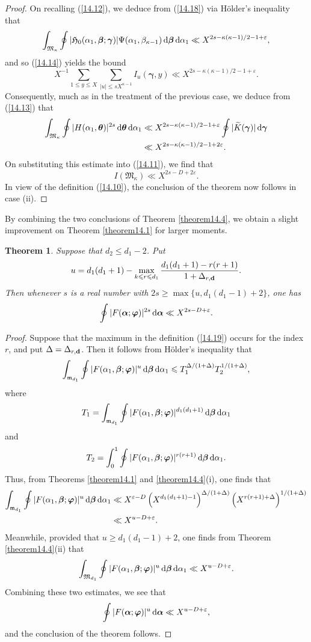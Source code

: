 \documentclass[12pt,reqno]{amsart}
\newtheorem{theorem}{Theorem}[section]
\theoremstyle{definition}
\theoremstyle{remark}
\numberwithin{equation}{section}
\def\bfd{{\mathbf d}} \def\bfe{{\mathbf e}} \def\bff{{\mathbf f}}
\def\grm{{\mathfrak m}}\def\grM{{\mathfrak M}}
\def\alp{{\alpha}} \def\bfalp{{\boldsymbol \alpha}}
\def\bet{{\beta}}  \def\bfbet{{\boldsymbol \beta}}
\def\gam{{\gamma}} \def\Gam{{\Gamma}}
\def\bfgam{{\boldsymbol \gam}}
\def\kap{{\kappa}}
\def\eps{\varepsilon}
\def\le{\leqslant} \def\ge{\geqslant} \def\pleq{\preccurlyeq} \def\ple{\prec}
\def\d{{\,{\rm d}}}
\begin{document}
\begin{proof}
On recalling (\ref{14.12}), we deduce from (\ref{14.18}) via H\"older's inequality that
$$\int_{\grM_\kap}\oint |\grH_0(\alp_1,\bfbet;\bfgam)|\Psi(\alp_1,\bet_{\kap-1})\d\bfbet 
\d\alp_1\ll X^{2s-\kap(\kap-1)/2-1+\eps},$$
and so (\ref{14.14}) yields the bound
$$X^{-1}\sum_{1\le y\le X}\sum_{|u|\le sX^{\kap-1}}I_u(\bfgam,y)\ll 
X^{2s-\kap(\kap-1)/2-1+\eps}.$$
Consequently, much as in the treatment of the previous case, we deduce from (\ref{14.13}) 
that
\begin{align*}
\int_{\grM_\kap}\oint |H(\alp_1,\bftet)|^{2s}\d\bftet \d\alp_1&\ll 
X^{2s-\kap(\kap-1)/2-1+\eps}\oint |\Ktil(\bfgam)|\d\bfgam \\
&\ll X^{2s-\kap(\kap-1)/2-1+2\eps}.
\end{align*}
On substituting this estimate into (\ref{14.11}), we find that
$$I(\grM_\kap)\ll X^{2s-D+2\eps}.$$
In view of the definition (\ref{14.10}), the conclusion of the theorem now follows in 
case (ii).
\end{proof}

By combining the two conclusions of Theorem \ref{theorem14.4}, we obtain a slight 
improvement on Theorem \ref{theorem14.1} for larger moments.

\begin{theorem}\label{theorem14.5} Suppose that $d_2\le d_1-2$. Put
\begin{equation}\label{14.19}
u=d_1(d_1+1)-\max_{k\le r\le d_1}\frac{d_1(d_1+1)-r(r+1)}{1+\Del_{r,\bfd}}.
\end{equation}
Then whenever $s$ is a real number with $2s\ge \max\{u,d_1(d_1-1)+2\}$, one has
$$\oint |F(\bfalp;\bfvarphi)|^{2s}\d\bfalp \ll X^{2s-D+\eps}.$$
\end{theorem}

\begin{proof} Suppose that the maximum in the definition (\ref{14.19}) occurs for the 
index $r$, and put $\Del=\Del_{r,\bfd}$. Then it follows from H\"older's inequality that
$$\int_{\grm_{d_1}}\oint |F(\alp_1,\bfbet;\bfvarphi)|^u\d\bfbet \d\alp_1 \le 
T_1^{\Del/(1+\Del)}T_2^{1/(1+\Del)},$$
where
$$T_1=\int_{\grm_{d_1}}\oint |F(\alp_1,\bfbet;\bfvarphi)|^{d_1(d_1+1)}\d\bfbet 
\d\alp_1$$
and
$$T_2=\int_0^1\oint |F(\alp_1,\bfbet;\bfvarphi)|^{r(r+1)}\d\bfbet \d\alp_1.$$
Thus, from Theorems \ref{theorem14.1} and \ref{theorem14.4}(i), one finds that
\begin{align*}
\int_{\grm_{d_1}}\oint |F(\alp_1,\bfbet;\bfvarphi)|^u\d\bfbet \d\alp_1&\ll X^{\eps-D}
\left( X^{d_1(d_1+1)-1} \right)^{\Del/(1+\Del)}\left( X^{r(r+1)+\Del}
\right)^{1/(1+\Del)}\\
&\ll X^{u-D+\eps}.
\end{align*}
Meanwhile, provided that $u\ge d_1(d_1-1)+2$, one finds from Theorem 
\ref{theorem14.4}(ii) that
$$\int_{\grM_{d_1}}\oint |F(\alp_1,\bfbet;\bfvarphi)|^u\d\bfbet \d\alp_1\ll X^{u-D+\eps}.
$$
Combining these two estimates, we see that
$$\oint |F(\bfalp;\bfvarphi)|^u\d\bfalp \ll X^{u-D+\eps},$$
and the conclusion of the theorem follows.
\end{proof}
\end{document}
